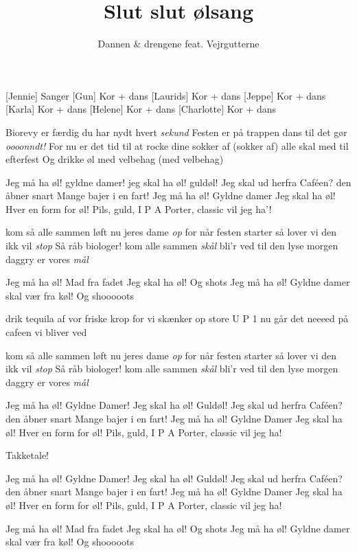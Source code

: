 \documentclass[a4paper,11pt]{article}
\title{Slut slut ølsang}
\author{Dannen \& drengene feat. Vejrgutterne}
\begin{document}
\maketitle

\begin{roles}
    [Jennie] Sanger
    [Gun] Kor + dans
    [Laurids] Kor + dans
    [Jeppe] Kor + dans
    [Karla] Kor + dans
    [Helene] Kor + dans
    [Charlotte] Kor + dans
\end{roles}

\begin{song}
  Biorevy er færdig
du har nydt hvert \emph{sekund}
Festen er på trappen
dans til det gør \emph{oooonndt!}
For nu er det tid til
at rocke dine sokker af
(sokker af)
alle skal med til efterfest
Og drikke øl med velbehag
(med velbehag)

Jeg må ha øl! gyldne damer!
jeg skal ha øl! guldøl!
Jeg skal ud herfra
Caféen? den åbner snart
Mange bajer i en fart!
Jeg må ha øl! Gyldne damer
Jeg skal ha øl! Hver en form for øl!
Pils, guld, I P A
Porter, classic vil jeg ha’!

kom så alle sammen
løft nu jeres dame \emph{op}
for når festen starter
så lover vi den ikk vil \emph{stop}
Så råb biologer!
kom alle sammen \emph{skål}
bli’r ved til den lyse morgen
daggry er vores \emph{mål}

Jeg må ha øl! Mad fra fadet
Jeg skal ha øl! Og shots
Jeg må ha øl! Gyldne damer
skal vær fra køl! Og shooooots

drik tequila af vor friske krop
for vi skænker op
store U P 1 nu går det neeeed
på cafeen vi bliver ved

kom så alle sammen
løft nu jeres dame \emph{op}
for når festen starter
så lover vi den ikk vil \emph{stop}
Så råb biologer!
kom alle sammen \emph{skål}
bli’r ved til den lyse morgen
daggry er vores \emph{mål}


Jeg må ha øl! Gyldne Damer!
Jeg skal ha øl! Guldøl!
Jeg skal ud herfra
Caféen? den åbner snart
Mange bajer i en fart!
Jeg må ha øl! Gyldne Damer
Jeg skal ha øl! Hver en form for øl!
Pils, guld, I P A
Porter, classic vil jeg ha!

 Takketale!

Jeg må ha øl! Gyldne Damer!
Jeg skal ha øl! Guldøl!
Jeg skal ud herfra
Caféen? den åbner snart
Mange bajer i en fart!
Jeg må ha øl! Gyldne Damer
Jeg skal ha øl! Hver en form for øl!
Pils, guld, I P A
Porter, classic vil jeg ha!


Jeg må ha øl! Mad fra fadet
Jeg skal ha øl! Og shots
Jeg må ha øl! Gyldne damer
skal vær fra køl! Og shooooots

\end{song}
\end{document}

